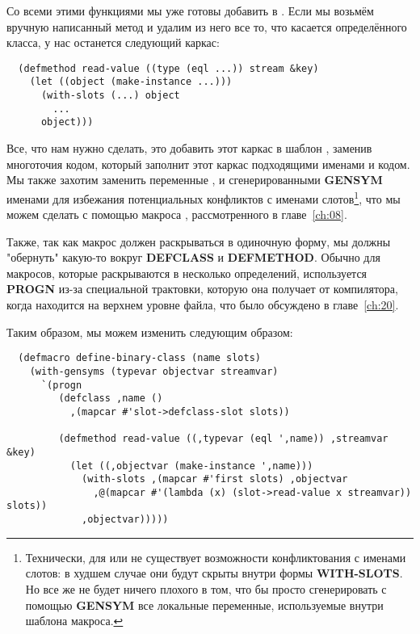 Со всеми этими функциями мы уже готовы добавить  в
. Если мы возьмём вручную написанный метод  и
удалим из него все то, что касается определённого класса, у нас останется следующий
каркас:

\begin{lstlisting}
  (defmethod read-value ((type (eql ...)) stream &key)
    (let ((object (make-instance ...)))
      (with-slots (...) object
        ...
      object)))
\end{lstlisting}

Все, что нам нужно сделать, это добавить этот каркас в шаблон ,
заменив многоточия кодом, который заполнит этот каркас подходящими именами и кодом. Мы
также захотим заменить переменные ,  и 
сгенерированными \textbf{GENSYM} именами для избежания потенциальных конфликтов с именами
слотов\footnote{Технически, для  или  не существует возможности
  конфликтования с именами слотов: в худшем случае они будут скрыты внутри формы
  \textbf{WITH-SLOTS}. Но все же не будет ничего плохого в том, что бы просто
  сгенерировать с помощью \textbf{GENSYM} все локальные переменные, используемые внутри
  шаблона макроса.}, что мы можем сделать с помощью макроса ,
рассмотренного в главе~\ref{ch:08}.

Также, так как макрос должен раскрываться в одиночную форму, мы должны "обернуть" какую-то
вокруг \textbf{DEFCLASS} и \textbf{DEFMETHOD}. Обычно для макросов, которые раскрываются в
несколько определений, используется \textbf{PROGN} из-за специальной трактовки, которую
она получает от компилятора, когда находится на верхнем уровне файла, что было обсуждено в
главе~\ref{ch:20}.

Таким образом, мы можем изменить  следующим образом:

\begin{lstlisting}
  (defmacro define-binary-class (name slots)
    (with-gensyms (typevar objectvar streamvar)
      `(progn
         (defclass ,name ()
           ,(mapcar #'slot->defclass-slot slots))

         (defmethod read-value ((,typevar (eql ',name)) ,streamvar &key)
           (let ((,objectvar (make-instance ',name)))
             (with-slots ,(mapcar #'first slots) ,objectvar
               ,@(mapcar #'(lambda (x) (slot->read-value x streamvar)) slots))
             ,objectvar)))))
\end{lstlisting}

